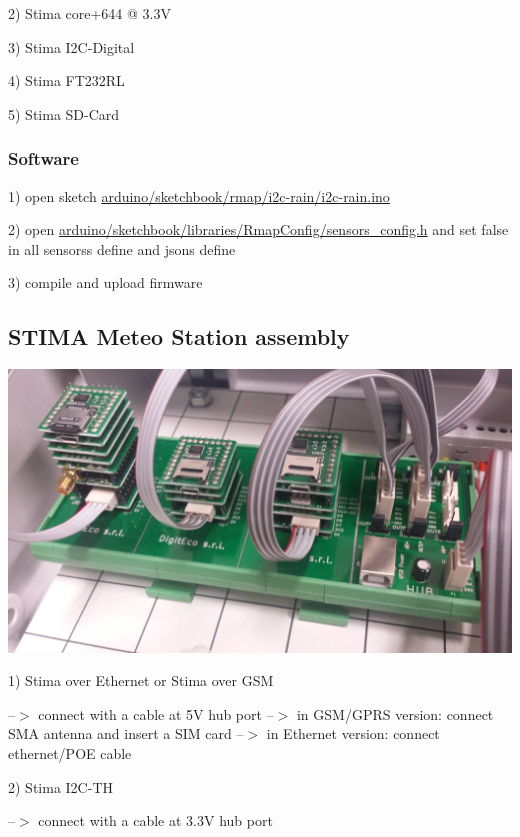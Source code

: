 2) Stima core+644 @ 3.\+3V

3) Stima I2\+C-\/\+Digital

4) Stima F\+T232\+RL

5) Stima S\+D-\/\+Card\hypertarget{index_stima_i2c_rain_software}{}\subsubsection{Software}\label{index_stima_i2c_rain_software}
1) open sketch \hyperlink{i2c-rain_8ino}{arduino/sketchbook/rmap/i2c-\/rain/i2c-\/rain.\+ino}

2) open \hyperlink{sensors__config_8h}{arduino/sketchbook/libraries/\+Rmap\+Config/sensors\+\_\+config.\+h} and set false in all sensors\textquotesingle{}s define and json\textquotesingle{}s define

3) compile and upload firmware\hypertarget{index_station}{}\subsection{S\+T\+I\+M\+A Meteo Station assembly}\label{index_station}
 
\begin{DoxyImageNoCaption}
  \mbox{\includegraphics[width=\textwidth,height=\textheight/2,keepaspectratio=true]{station.jpg}}
\end{DoxyImageNoCaption}


1) Stima over Ethernet or Stima over G\+SM

--$>$ connect with a cable at 5V hub port --$>$ in G\+S\+M/\+G\+P\+RS version\+: connect S\+MA antenna and insert a S\+IM card --$>$ in Ethernet version\+: connect ethernet/\+P\+OE cable

2) Stima I2\+C-\/\+TH

--$>$ connect with a cable at 3.\+3V hub port

